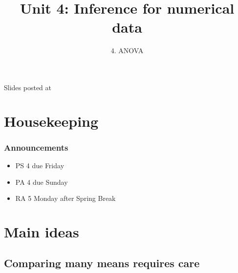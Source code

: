 \documentclass[11pt,containsverbatim,handout,xcolor=xelatex,dvipsnames,table]{beamer}
\title{Unit 4: Inference for numerical data}
\subtitle{4. ANOVA}
\author{\CourseName}
\date{}
\institute{\InstituteName}
\begin{document}



\begin{frame}[plain]

\titlepage

\vfill

{\scriptsize {} \hfill Slides posted at  \webURL{\CourseSite}}

\addtocounter{framenumber}{-1} 

\end{frame}


\section{Housekeeping}


\begin{frame}
\frametitle{Announcements}

\begin{itemize}

\item PS 4 due Friday

\item PA 4 due Sunday

\item RA 5 Monday after Spring Break

\end{itemize}

\end{frame}


\section{Main ideas}


\subsection{Comparing many means requires care}
\label{mi1}

\end{document}
